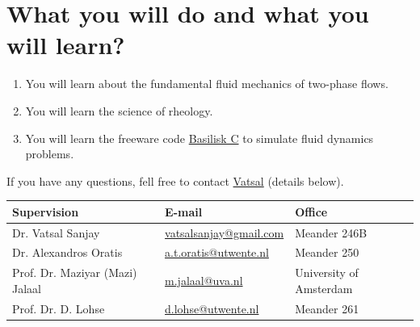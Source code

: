 \documentclass[a4paper,10pt]{article}
\begin{document}
\section*{What you will do and what you will learn?}
\begin{enumerate}
\item You will learn about the fundamental fluid mechanics of two-phase flows.
\item You will learn the science of rheology.
\item You will learn the freeware code \href{http://basilisk.fr}{Basilisk C} to simulate fluid dynamics problems.
\end{enumerate}

If you have any questions, fell free to contact \href{mailto:vatsalsanjay@gmail.com}{Vatsal} (details below).
\begin{center}
\begin{tabular}{|l|l|l|}
\hline \textbf{Supervision} & \textbf{E-mail} & \textbf{Office} \\
\hline Dr. Vatsal Sanjay & \href{mailto:vatsalsanjay@gmail.com}{vatsalsanjay@gmail.com} & Meander 246B \\
\hline Dr. Alexandros Oratis   & \href{mailto:a.t.oratis@utwente.nl}{a.t.oratis@utwente.nl}& Meander 250 \\
\hline Prof. Dr. Maziyar (Mazi) Jalaal   & \href{mailto:m.jalaal@uva.nl}{m.jalaal@uva.nl}& University of Amsterdam \\
\hline Prof. Dr. D. Lohse & \href{mailto:d.lohse@utwente.nl}{d.lohse@utwente.nl} & Meander 261  \\
\hline
\end{tabular}
\end{center}
\printbibliography
\end{document}
